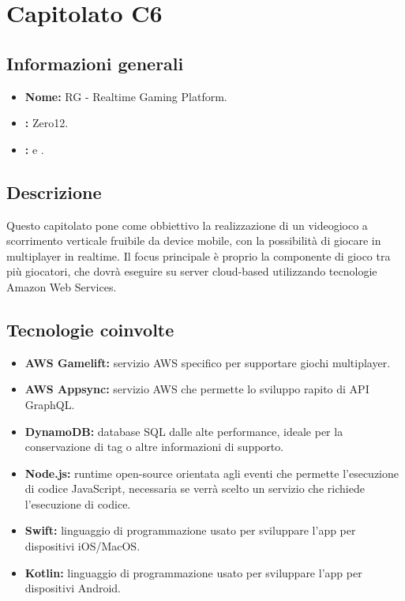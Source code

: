 \section{Capitolato C6}

\subsection{Informazioni generali}
\begin{itemize}
\item \textbf{Nome:} RG - Realtime Gaming Platform.
\item \textbf{\commitProg:} Zero12.
\item \textbf{\proponProg:} \VT{} e \CR.
\end{itemize}

\subsection{Descrizione}
Questo capitolato pone come obbiettivo la realizzazione di un videogioco a scorrimento verticale fruibile da device mobile, con la possibilità di giocare in multiplayer in realtime. Il focus principale è proprio la componente di gioco tra più giocatori, che dovrà eseguire su server cloud-based utilizzando tecnologie Amazon Web Services.

\subsection{Tecnologie coinvolte}
\begin{itemize}
\item \textbf{AWS Gamelift:} servizio AWS specifico per supportare giochi multiplayer.
\item \textbf{AWS Appsync:} servizio AWS che permette lo sviluppo rapito di API GraphQL.
\item \textbf{DynamoDB:} database SQL dalle alte performance, ideale per la conservazione di tag o altre informazioni di supporto.
\item \textbf{Node.js:} runtime open-source orientata agli eventi che permette l'esecuzione di codice JavaScript, necessaria se verrà scelto un servizio che richiede l'esecuzione di codice.
\item \textbf{Swift:} linguaggio di programmazione usato per sviluppare l'app per dispositivi iOS/MacOS.
\item \textbf{Kotlin:} linguaggio di programmazione usato per sviluppare l'app per dispositivi Android.
\end{itemize}

